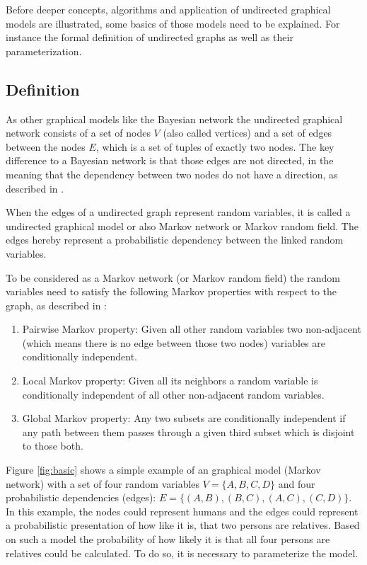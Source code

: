 Before deeper concepts, algorithms and application of undirected graphical models are illustrated, some basics of those models need to be explained. For instance the formal definition of undirected graphs as well as their parameterization.

\subsection{Definition}

As other graphical models like the Bayesian network the undirected graphical network consists of a set of nodes $V$ (also called vertices) and a set of edges between the nodes $E$, which is a set of tuples of exactly two nodes. The key difference to a Bayesian network is that those edges are not directed, in the meaning that the dependency between two nodes do not have a direction, as described in \cite{koller2009probabilistic}.

When the edges of a undirected graph represent random variables, it is called a undirected graphical model or also Markov network or Markov random field.\cite{kindermann1980markov} The edges hereby represent a probabilistic dependency between the linked random variables.

To be considered as a Markov network (or Markov random field) the random variables need to satisfy the following Markov properties with respect to the graph, as described in \cite{markov1957theory}:

\begin{enumerate}
\item Pairwise Markov property: Given all other random variables two non-adjacent (which means there is no edge between those two nodes) variables are conditionally independent.
\item Local Markov property: Given all its neighbors a random variable is conditionally independent of all other non-adjacent random variables.
\item Global Markov property: Any two subsets are conditionally independent if any path between them passes through a given third subset which is disjoint to those both.  
\end{enumerate}


Figure \ref{fig:basic} shows a simple example of an graphical model (Markov network) with a set of four random variables $V=\{A,B,C,D\}$ and four probabilistic dependencies (edges): $E=\{(A,B),(B,C),(A,C),(C,D)\}$. In this example, the nodes could represent humans and the edges could represent a probabilistic presentation of how like it is, that two persons are relatives. Based on such a model the probability of how likely it is that all four persons are relatives could be calculated. To do so, it is necessary to parameterize the model.

